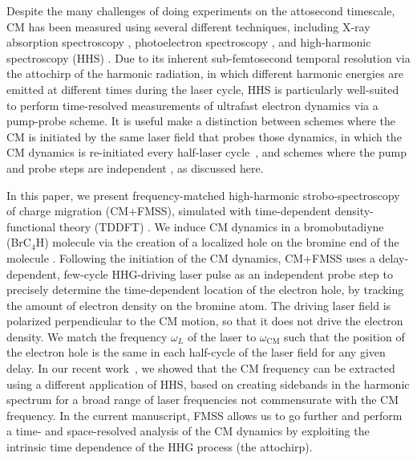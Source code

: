 \documentclass[journal=jacsat,manuscript=article]{achemso}
\begin{document}
Despite the many challenges of doing experiments on the attosecond timescale, CM has been measured using several different techniques, including X-ray absorption spectroscopy \cite{goulielmakis2010, matselyukh2022, barillot2022, young2018}, photoelectron spectroscopy \cite{stolow2004, calegari2014, ayuso2017, lara-astiaso2018}, and high-harmonic spectroscopy (HHS) \cite{worner2013, kraus2015, peng2019, he2022}. Due to its inherent sub-femtosecond temporal resolution via the attochirp \cite{mairesse2003, dudovich2006, smirnova2009, azoury2017} of the harmonic radiation, in which different harmonic energies are emitted at different times during the laser cycle, HHS is particularly well-suited to perform time-resolved measurements of ultrafast electron dynamics via a pump-probe scheme. It is useful make a distinction between schemes where the CM is initiated by the same laser field that probes those dynamics, in which the CM dynamics is re-initiated every half-laser cycle~\cite{kraus2015, he2022, he2023}, and schemes where the pump and probe steps are independent \cite{hamer2022}, as discussed here. 

In this paper, we present frequency-matched high-harmonic strobo-spectroscopy of charge migration (CM+FMSS), simulated with time-dependent density-functional theory (TDDFT) \cite{kohn1965, runge1984}. We induce CM dynamics in a bromobutadiyne (BrC$_{4}$H) molecule via the creation of a localized hole on the bromine end of the molecule \cite{folorunso2021, hamer2022}. Following the initiation of the CM dynamics, CM+FMSS uses a delay-dependent, few-cycle HHG-driving laser pulse as an independent probe step to precisely determine the time-dependent location of the electron hole, by tracking the amount of electron density on the bromine atom. The driving laser field is polarized perpendicular to the CM motion, so that it does not drive the electron density. We match the frequency $\omega_{L}$ of the laser to $\omega_{\text{CM}}$ such that the position of the electron hole is the same in each half-cycle of the laser field for any given delay. In our recent work~\cite{hamer2022}, we showed that the CM frequency can be extracted using a different application of HHS, based on creating sidebands in the harmonic spectrum for a broad range of laser frequencies not commensurate with the CM frequency. In the current manuscript, FMSS allows us to go further and perform a time- and space-resolved analysis of the CM dynamics by exploiting the intrinsic time dependence of the HHG process (the attochirp).
\end{document}
